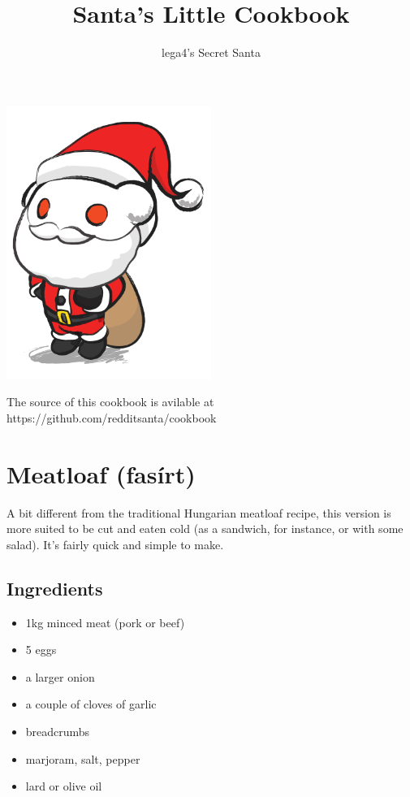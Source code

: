 \documentclass{article}
\title{Santa's Little Cookbook}
\author{lega4's Secret Santa}
\begin{document}
\maketitle

\begin{center}
\vspace{1cm}

\vspace{2cm}

\includegraphics[width=0.5\textwidth]{logo}

The source of this cookbook is avilable at
\\
https://github.com/redditsanta/cookbook
\end{center}


\newpage
\section{Meatloaf (fasírt)}

A bit different from the traditional Hungarian meatloaf recipe, this version is more suited to be cut and eaten cold (as a sandwich, for instance, or with some salad). It's fairly quick and simple to make. 

\subsection{Ingredients}
\begin{itemize}
    \item 1kg minced meat (pork or beef)
    \item 5 eggs
    \item a larger onion
    \item a couple of cloves of garlic
    \item breadcrumbs
    \item marjoram, salt, pepper
    \item lard or olive oil
\end{itemize}
\end{document}
